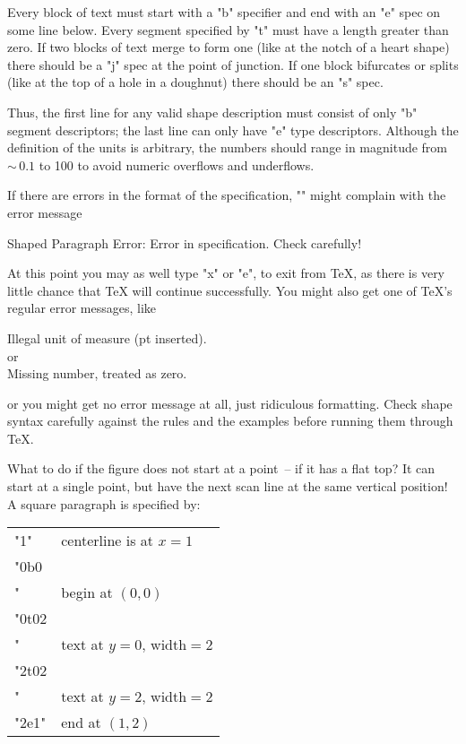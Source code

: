 \documentclass[draft]{article}
\makeatletter
\DeclareRobustCommand{\_}{%
  \ifmmode \nfss@text{\textunderscore}\else \BreakableUnderscore \fi}
\makeatother
\begin{document}
\medskip

Every block of text must start with a "b" specifier and end with an "e"
spec on some line below.  Every segment specified by "t" must have a
length greater than zero. If two blocks of text merge to form one (like
at the notch of a heart shape) there should be a "j" spec at the point of
junction.  If one block bifurcates or splits (like at the top of a hole in
a doughnut) there should be an "s" spec.

Thus, the first line for any valid shape description must consist
of only "b" segment descriptors; the last line can only have "e" type
descriptors.  Although the definition of the units is arbitrary, the
numbers should range in magnitude from ${\sim}\,0.1$ to 100 to avoid
numeric overflows and underflows.

If there are errors in the format of the specification, "\shapepar"
might complain with the error message
\begin{flushleft}
Shaped Paragraph Error:  Error in specification.  Check carefully!
\end{flushleft}
At this point you may as well type "x" or "e", to exit from \TeX,
as there is very little chance that {\TeX} will continue successfully.
You might also get one of \TeX's regular error messages, like
\begin{flushleft}
Illegal unit of measure (pt inserted).\\[3pt]
or\\[3pt]
Missing number, treated as zero.
\end{flushleft}
or you might get no error message at all, just ridiculous formatting.
Check shape syntax carefully against the rules and the examples before
running them through \TeX.

\medskip

What to do if the figure does not start at a point~-- if it has a flat
top?  It can start at a single point, but have the next scan line at
the same vertical position!  A square paragraph is specified by:
\begin{flushleft}
\begin{tabular}{@{}ll}
  "{1}"          &  centerline is at $x=1$\\
  "{0}b{0}\\"    &  begin at $(0,0)$\\
  "{0}t{0}{2}\\" &  text at $y=0$, width${}=2$\\
  "{2}t{0}{2}\\" &  text at $y=2$, width${}=2$\\
  "{2}e{1}"      &  end at $(1,2)$
\end{tabular}
\end{flushleft}
\end{document}
